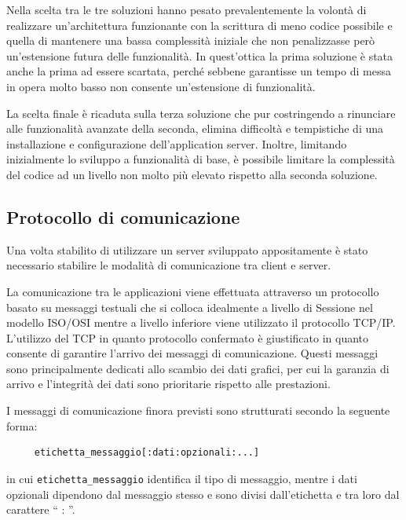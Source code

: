 Nella scelta tra le tre soluzioni hanno pesato prevalentemente la volont\`a di realizzare un'architettura funzionante con la scrittura di meno codice possibile e quella di mantenere una bassa complessit\`a iniziale che non penalizzasse per\`o un'estensione futura delle funzionalit\`a. In quest'ottica la prima soluzione \`e stata anche la prima ad essere scartata, perch\'e sebbene garantisse un tempo di messa in opera molto basso non consente un'estensione di funzionalit\`a. 

La scelta finale \`e ricaduta sulla terza soluzione che pur costringendo a rinunciare alle funzionalit\`a avanzate della seconda, elimina difficolt\`a e tempistiche di una installazione e configurazione dell'application server. Inoltre, limitando inizialmente lo sviluppo a funzionalit\`a di base, \`e possibile limitare la complessit\`a del codice ad un livello non molto pi\`u elevato rispetto alla seconda soluzione.

\subsection{Protocollo di comunicazione}
\label{sub:comprotocol}
Una volta stabilito di utilizzare un server sviluppato appositamente \`e stato necessario stabilire le modalit\`a di comunicazione tra client e server. 

La comunicazione tra le applicazioni viene effettuata attraverso un protocollo basato su messaggi testuali che si colloca idealmente a livello di Sessione nel modello ISO/OSI \cite{book:computernetworking} mentre a livello inferiore viene utilizzato il protocollo TCP/IP.
L'utilizzo del TCP in quanto protocollo confermato \`e giustificato in quanto consente di garantire l'arrivo dei messaggi di comunicazione. Questi messaggi sono principalmente dedicati allo scambio dei dati grafici, per cui la garanzia di arrivo e l'integrit\`a dei dati sono prioritarie rispetto alle prestazioni.


I messaggi di comunicazione finora previsti sono strutturati secondo la seguente forma:
\begin{verbatim}
     etichetta_messaggio[:dati:opzionali:...]
\end{verbatim}
in cui \texttt{etichetta\_messaggio} identifica il tipo di messaggio, mentre i dati opzionali dipendono dal messaggio stesso e sono divisi dall'etichetta e tra loro dal carattere `` : ''.

